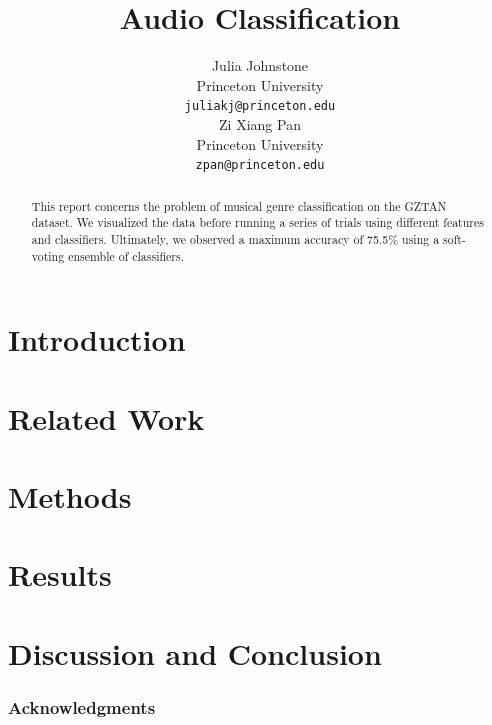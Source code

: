 \documentclass{article} %
\title{Audio Classification}
\author{
Julia Johnstone\\
Princeton University\\
\texttt{juliakj@princeton.edu} \\
\And
Zi Xiang Pan \\
Princeton University \\
\texttt{zpan@princeton.edu} \\
}
\begin{document}
\maketitle

\begin{abstract}
This report concerns the problem of musical genre classification on the GZTAN dataset. We visualized the data before running a series of trials using different features and classifiers. Ultimately, we observed a maximum accuracy of 75.5\% using a soft-voting ensemble of classifiers. 
\end{abstract}

\section{Introduction}



\section{Related Work}



\section{Methods}



\section{Results}



\section{Discussion and Conclusion}



\subsubsection*{Acknowledgments}





\end{document}

